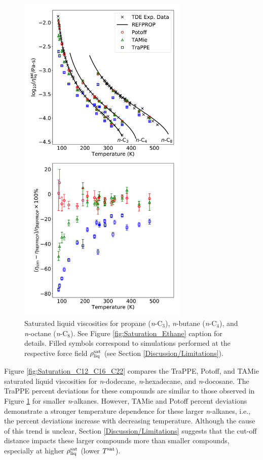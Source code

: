 \documentclass[preprint,review,12pt]{elsarticle}
\begin{document}
	
	\begin{figure}[htb!]
		\centering
		\includegraphics[width=3.2in]{compare_force_fields_short_normal.pdf}
		\caption{Saturated liquid viscosities for propane (\textit{n}-C$_{3}$), \textit{n}-butane (\textit{n}-C$_{4}$), and \textit{n}-octane (\textit{n}-C$_{8}$). See Figure \ref{fig:Saturation_Ethane} caption for details. Filled symbols correspond to simulations performed at the respective force field $\rho_{\rm liq}^{\rm sat}$ (see Section \ref{Discussion/Limitations}).}
		\label{fig:Saturation_C3_C4_C8}
	\end{figure} 
	
	Figure \ref{fig:Saturation_C12_C16_C22} compares the TraPPE, Potoff, and TAMie saturated liquid viscosities for \textit{n}-dodecane, \textit{n}-hexadecane, and \textit{n}-docosane. The TraPPE percent deviations for these compounds are similar to those observed in Figure \ref{fig:Saturation_C3_C4_C8} for smaller \textit{n}-alkanes. However, TAMie and Potoff percent deviations demonstrate a stronger temperature dependence for these larger \textit{n}-alkanes, i.e., the percent deviations increase with decreasing temperature. Although the cause of this trend is unclear, Section \ref{Discussion/Limitations} suggests that the cut-off distance impacts these larger compounds more than smaller compounds, especially at higher $\rho_{\rm liq}^{\rm sat}$ (lower $T^{\rm sat}$).
	
\end{document}
